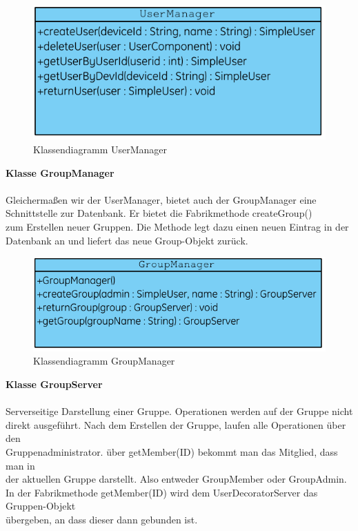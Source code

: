 \begin{figure}[h]
     \centering
     \includegraphics[scale=1.0, trim=1 1 1 1,clip=true]{servergraphs/user-manager.pdf}
     \caption{Klassendiagramm UserManager}
\end{figure}
\clearpage

\textbf{Klasse GroupManager}\\
\\
Gleichermaßen wir der UserManager, bietet auch der GroupManager eine \\
Schnittstelle zur Datenbank. Er bietet die Fabrikmethode createGroup()\\
zum Erstellen neuer Gruppen. Die Methode legt dazu einen neuen Eintrag in der\\
Datenbank an und liefert das neue Group-Objekt zurück.\\



\begin{figure}[h]
     \centering
     \includegraphics[scale=1.0, trim=2 2 2 2, clip=true]{servergraphs/group-manager.pdf}
     \caption{Klassendiagramm GroupManager}
\end{figure}
\clearpage

\textbf{Klasse GroupServer}\\
\\
Serverseitige Darstellung einer Gruppe. Operationen werden auf der Gruppe nicht\\
direkt ausgeführt. Nach dem Erstellen der Gruppe, laufen alle Operationen über den\\
Gruppenadministrator. über getMember(ID) bekommt man das Mitglied, dass man in \\
der aktuellen Gruppe darstellt. Also entweder GroupMember oder GroupAdmin.
In der Fabrikmethode getMember(ID) wird dem UserDecoratorServer das Gruppen-Objekt\\
übergeben, an dass dieser dann gebunden ist.\\


